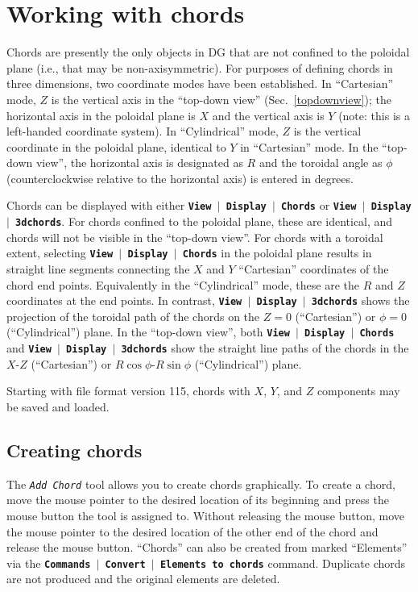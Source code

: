 \documentclass[12pt]{report}
\begin{document}
\chapter{Working with chords}
\label{chords}

Chords are presently the only objects in DG that are not confined to the
poloidal plane (i.e., that may be non-axisymmetric).
For purposes of defining chords in three
dimensions, two coordinate
modes have been established. 
In ``Cartesian'' mode, $Z$ is the
vertical axis in the ``top-down view'' (Sec.~\ref{topdownview});
the horizontal axis in the poloidal plane is $X$ and the
vertical axis is $Y$ (note: this is a left-handed coordinate system).
In ``Cylindrical'' mode, $Z$ is the vertical coordinate in the poloidal
plane, identical to $Y$ in ``Cartesian'' mode. 
In the ``top-down view'',
the horizontal axis is
designated as $R$ and the toroidal angle as $\phi$ (counterclockwise relative
to the horizontal axis) is entered in degrees. 

Chords can be displayed with either 
\textbf{\texttt{View $\mid$ Display $\mid$ Chords}} or 
\textbf{\texttt{View $\mid$ Display $\mid$ 3dchords}}.  For chords
confined to the poloidal plane, these are identical, and chords will
not be visible in the ``top-down view''.  For chords with a toroidal
extent, selecting 
\textbf{\texttt{View $\mid$ Display $\mid$ Chords}} in the 
poloidal plane results in straight
line segments connecting the 
$X$ and $Y$ ``Cartesian'' coordinates of the chord end points.
Equivalently in the ``Cylindrical'' mode, these are the $R$
and $Z$ coordinates at the end points.  In contrast,
\textbf{\texttt{View $\mid$ Display $\mid$ 3dchords}} shows the projection
of the toroidal path of the chords on the $Z = 0$ (``Cartesian'')
or $\phi = 0$ (``Cylindrical'') plane.  In the ``top-down view'',
both \textbf{\texttt{View $\mid$ Display $\mid$ Chords}} and
\textbf{\texttt{View $\mid$ Display $\mid$ 3dchords}} show the straight
line paths of the chords in the $X$-$Z$ (``Cartesian'') or
$R \cos \phi$-$R \sin \phi$ (``Cylindrical'') plane.

Starting with file format version 115, chords with $X$, $Y$,
and $Z$
components may be saved and loaded.

\section{Creating chords}

The \textit{\texttt{Add Chord}} tool 
allows you to create chords graphically.  To
create a chord, move the mouse pointer to the desired location of its
beginning and press the mouse button the tool is assigned to. Without
releasing the mouse button, move the mouse pointer to the desired
location of the other end of the chord and release the mouse button.
``Chords'' can also be created from marked ``Elements'' via the 
\textbf{\texttt{Commands $\mid$ Convert $\mid$ Elements to chords}}
command.  Duplicate chords are not produced and the 
original elements are deleted.
\end{document}

